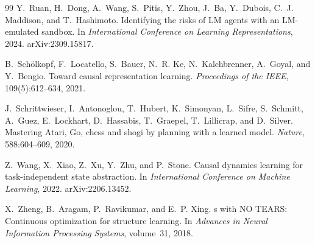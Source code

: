 \begin{thebibliography}{99}
Y.~Ruan, H.~Dong, A.~Wang, S.~Pitis, Y.~Zhou, J.~Ba, Y.~Dubois, C.~J. Maddison, and T.~Hashimoto.
\newblock Identifying the risks of {LM} agents with an {LM}-emulated sandbox.
\newblock In \emph{International Conference on Learning Representations}, 2024.
\newblock arXiv:2309.15817.

B.~Sch{\"o}lkopf, F.~Locatello, S.~Bauer, N.~R. Ke, N.~Kalchbrenner, A.~Goyal, and Y.~Bengio.
\newblock Toward causal representation learning.
\newblock \emph{Proceedings of the IEEE}, 109(5):612--634, 2021.

J.~Schrittwieser, I.~Antonoglou, T.~Hubert, K.~Simonyan, L.~Sifre, S.~Schmitt, A.~Guez, E.~Lockhart, D.~Hassabis, T.~Graepel, T.~Lillicrap, and D.~Silver.
\newblock Mastering {A}tari, {G}o, chess and shogi by planning with a learned model.
\newblock \emph{Nature}, 588:604--609, 2020.

Z.~Wang, X.~Xiao, Z.~Xu, Y.~Zhu, and P.~Stone.
\newblock Causal dynamics learning for task-independent state abstraction.
\newblock In \emph{International Conference on Machine Learning}, 2022.
\newblock arXiv:2206.13452.

X.~Zheng, B.~Aragam, P.~Ravikumar, and E.~P. Xing.
s with {NO TEARS}: Continuous optimization for structure learning.
\newblock In \emph{Advances in Neural Information Processing Systems}, volume~31, 2018.

\end{thebibliography}
